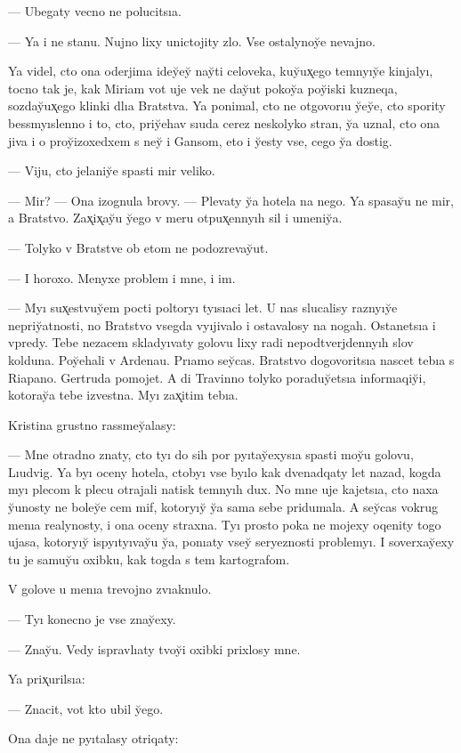 \documentclass[10pt]{book}
\begin{document}
— Ubegaty vecno ne polucitsıa.

— Ya i ne stanu. Nujno lixy unictojity zlo. Vse ostalynoy̆e nevajno.

Ya videl, cto ona oderjima idey̆ey̆ nay̆ti celoveka, kuy̆ux̨ego temnyıy̆e kinjalyı, tocno tak je, kak Miriam vot uje vek ne day̆ut pokoy̆a poy̆iski kuzneqa, sozday̆ux̨ego klinki dlıa Bratstva. Ya ponimal, cto ne otgovorıu y̆ey̆e, cto spority bessmyıslenno i to, cto, priy̆ehav sıuda cerez neskolyko stran, y̆a uznal, cto ona jiva i o proy̆izoxedxem s ney̆ i Gansom, eto i y̆esty vse, cego y̆a dostig.

— Viju, cto jelaniy̆e spasti mir veliko.

— Mir? — Ona izognula brovy. — Plevaty y̆a hotela na nego. Ya spasay̆u ne mir, a Bratstvo. Zax̨ix̨ay̆u y̆ego v meru otpux̨ennyıh sil i umeniy̆a.

— Tolyko v Bratstve ob etom ne podozrevay̆ut.

— I horoxo. Menyxe problem i mne, i im.

— Myı sux̨estvuy̆em pocti poltoryı tyısıaci let. U nas slucalisy raznyıy̆e nepriy̆atnosti, no Bratstvo vsegda vyıjivalo i ostavalosy na nogah. Ostanetsıa i vpredy. Tebe nezacem skladyıvaty golovu lixy radi nepodtverjdennyıh slov kolduna. Poy̆ehali v Ardenau. Prıamo sey̆cas. Bratstvo dogovoritsıa nascet tebıa s Riapano. Gertruda pomojet. A di Travinno tolyko poraduy̆etsıa informaqiy̆i, kotoray̆a tebe izvestna. Myı zax̨itim tebıa.

Kristina grustno rassmey̆alasy:

— Mne otradno znaty, cto tyı do sih por pyıtay̆exysıa spasti moy̆u golovu, Lıudvig. Ya byı oceny hotela, ctobyı vse byılo kak dvenadqaty let nazad, kogda myı plecom k plecu otrajali natisk temnyıh dux. No mne uje kajetsıa, cto naxa y̆unosty ne boley̆e cem mif, kotoryıy̆ y̆a sama sebe pridumala. A sey̆cas vokrug menıa realynosty, i ona oceny straxna. Tyı prosto poka ne mojexy oqenity togo ujasa, kotoryıy̆ ispyıtyıvay̆u y̆a, ponıaty vsey̆ seryeznosti problemyı. I soverxay̆exy tu je samuy̆u oxibku, kak togda s tem kartografom.

V golove u menıa trevojno zvıaknulo.

— Tyı konecno je vse znay̆exy.

— Znay̆u. Vedy ispravlıaty tvoy̆i oxibki prixlosy mne.

Ya prix̨urilsıa:

— Znacit, vot kto ubil y̆ego.

Ona daje ne pyıtalasy otriqaty:
\end{document}
